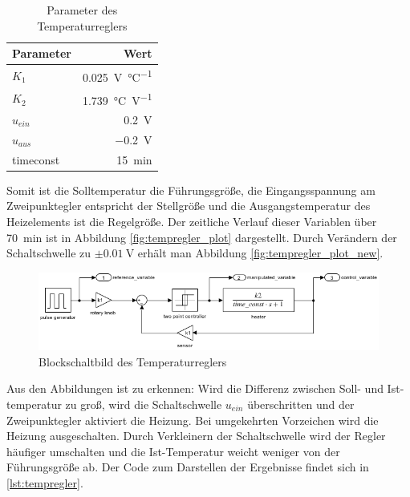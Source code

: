 \documentclass[
    paper=a4,
    fontsize=10pt,
    DIV=13,
    oneside,
]{scrartcl}
\begin{document}
    \begin{table}[hbt]
        \centering
        \caption{Parameter des Temperaturreglers}
        \label{tab:tempregler}
        \begin{tabular}{lr}\toprule
            Parameter   &   Wert\\\midrule
            \(K_1\)     & \SI{0.025}{\volt\per\celsius}\\\addlinespace
            \(K_2\)     & \SI{1,739}{\celsius\per\volt}\\\addlinespace
            \(u_{ein}\) & \SI{0.2}{\volt}\\
            \(u_{aus}\) & \SI{-0.2}{\volt}\\
            timeconst   & \SI{15}{\minute}\\\bottomrule
        \end{tabular}
    \end{table}
    
    Somit ist die Solltemperatur die Führungsgröße, die Eingangsspannung am Zweipunktegler entspricht der Stellgröße und die Ausgangstemperatur des Heizelements ist die Regelgröße. Der zeitliche Verlauf dieser Variablen über \SI{70}{\minute} ist in Abbildung \ref{fig:tempregler_plot} dargestellt. Durch Verändern der Schaltschwelle zu  \(\pm\SI{0.01}{\volt}\) erhält man Abbildung \ref{fig:tempregler_plot_new}.

    \begin{figure}
        \centering
        \includegraphics[width=\imagewidth]{../versuch1/tempregler_block.png}
        \caption{Blockschaltbild des Temperaturreglers}
        \label{fig:tempregler_block}
    \end{figure}    

    Aus den Abbildungen ist zu erkennen: Wird die Differenz zwischen Soll- und Ist-temperatur zu groß, wird die Schaltschwelle \(u_{ein}\) überschritten und der Zweipunktegler aktiviert die Heizung. Bei umgekehrten Vorzeichen wird die Heizung ausgeschalten. Durch Verkleinern der Schaltschwelle wird der Regler häufiger umschalten und die Ist-Temperatur weicht weniger von der Führungsgröße ab. Der Code zum Darstellen der Ergebnisse findet sich in \ref{lst:tempregler}.
\end{document}

